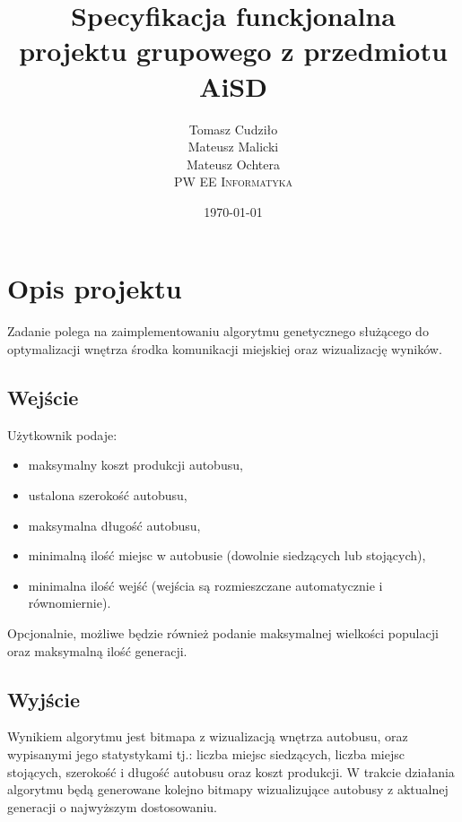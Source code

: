 \documentclass[10pt,a4paper]{article}
\begin{document}
\title{
  Specyfikacja funckjonalna\\
  projektu grupowego z przedmiotu AiSD
}
\author{
  Tomasz Cudziło\\
  Mateusz Malicki\\
  Mateusz Ochtera\\[14pt]
  \textsc{PW EE Informatyka}\\[7pt]
}
\date{\today}
\maketitle



\section{Opis projektu}

Zadanie polega na zaimplementowaniu algorytmu genetycznego służącego do
optymalizacji wnętrza środka komunikacji miejskiej oraz wizualizację wyników.

\subsection{Wejście}
Użytkownik podaje:
\begin{itemize}
  \item maksymalny koszt produkcji autobusu,
  \item ustalona szerokość autobusu,
  \item maksymalna długość autobusu,
  \item minimalną ilość miejsc w autobusie (dowolnie siedzących lub stojących),
  \item minimalna ilość wejść (wejścia są rozmieszczane automatycznie i
    równomiernie).
\end{itemize}
Opcjonalnie, możliwe będzie również podanie maksymalnej wielkości populacji oraz
maksymalną ilość generacji.

\subsection{Wyjście}
Wynikiem algorytmu jest bitmapa z wizualizacją wnętrza autobusu, oraz wypisanymi
jego statystykami tj.: liczba miejsc siedzących, liczba miejsc stojących,
szerokość i długość autobusu oraz koszt produkcji.
W trakcie działania algorytmu będą generowane kolejno bitmapy wizualizujące
autobusy z aktualnej generacji o najwyższym dostosowaniu.
\end{document}
